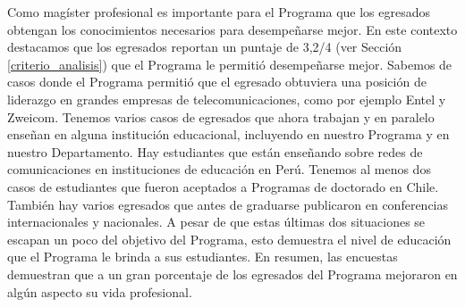 Como magíster profesional es importante para el Programa que los egresados obtengan los conocimientos 
necesarios para desempeñarse mejor. En este contexto destacamos que los egresados
reportan un puntaje de 3,2/4 (ver Sección \ref{criterio_analisis}) que el Programa le permitió desempeñarse mejor. 
Sabemos de casos donde el Programa permitió que el egresado obtuviera una posición de liderazgo en 
grandes empresas de telecomunicaciones, como por ejemplo Entel y Zweicom. %
Tenemos varios casos de egresados que ahora trabajan y en paralelo
enseñan en alguna institución educacional, incluyendo en nuestro Programa y en nuestro Departamento. %
Hay estudiantes que están enseñando sobre redes de comunicaciones en instituciones de educación en Perú. Tenemos al menos dos casos 
de estudiantes que fueron aceptados a Programas de doctorado en Chile. También hay varios egresados que antes de graduarse 
publicaron en conferencias internacionales y nacionales. A pesar de que estas últimas dos situaciones se escapan un poco 
del objetivo del Programa, esto demuestra el nivel de educación que el Programa le brinda a sus estudiantes. %
En resumen, las encuestas demuestran que a un gran porcentaje de los egresados del 
Programa mejoraron en algún aspecto su vida profesional.




